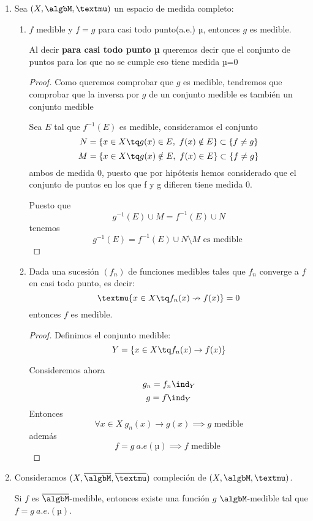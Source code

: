 \documentclass{apuntes}
\begin{document}
\begin{enumerate}
\begin{enumerate}
\begin{proof}
Además,
\[\lim \varphi_n (x)= f(x)\]
\[|\varphi_n|^2 = |\Psi_n|^2+|\varsigma_n|^2\]

\end{proof}
\end{enumerate}

\item Sea $(X, \algbM, µ)$ un espacio de medida completo:
\begin{enumerate}
\item $f$ medible y $f=g$ para casi todo punto(a.e.) µ, entonces $g$ es medible.

Al decir \textbf{para casi todo punto µ} queremos decir que el conjunto de puntos para los que no se cumple eso tiene medida µ=0
\begin{proof}
Como queremos comprobar que $g$ es medible, tendremos que comprobar que la inversa por $g$ de un conjunto medible es también un conjunto medible

Sea $E$ tal que $f^{-1}(E)$ es medible, consideramos el conjunto
\[N= \{x \in X \tq g(x)\in E, \ f(x) \notin E\}\subset \{f \neq g\}\]
\[M= \{x \in X \tq g(x)\notin E, \ f(x) \in E\}\subset \{f \neq g\}\]
ambos de medida 0, puesto que por hipótesis hemos considerado que el conjunto de puntos en los que f y g difieren tiene medida 0.

Puesto que
\[g^{-1}(E) \cup M = f^{-1}(E)\cup N\]
tenemos
\[g^{-1}(E) = f^{-1}(E)\cup N \setminus M \text{ es medible }\]
\end{proof}

\newpage
\item Dada una sucesión $(f_n)$ de funciones medibles tales que $f_n$ converge a $f$ en casi todo punto, es decir:
\[µ\{x \in X \tq f_n(x) \nrightarrow f(x)\} = 0\]
entonces $f$ es medible.

\begin{proof}
Definimos el conjunto medible:
\[Y=\{x \in X \tq f_n(x)\rightarrow f(x)\}\]

Consideremos ahora
\[g_n = f_n \ind_Y\]
\[g = f \ind_Y\]
Entonces
\[\forall x \in X \ g_n(x) \rightarrow g(x) \implies g \text{ medible}\]
además
\[f=g \ a.e(µ) \implies f \text{ medible }\]
\end{proof}
\end{enumerate}

\item Consideramos $(X, \overline{\algbM}, \overline{µ})$ compleción de $(X, \algbM, µ)$.

Si $f$ es $\overline{\algbM}$-medible, entonces existe una función $g$ $\algbM$-medible tal que $f=g \ a.e.(µ)$.


\end{enumerate}
\end{document}
